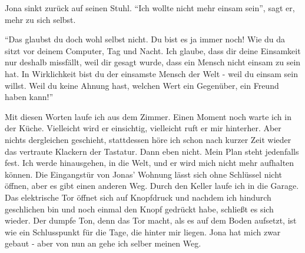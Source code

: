 Jona sinkt zurück auf seinen Stuhl. "`Ich wollte nicht mehr einsam sein"', sagt er, mehr zu sich selbst.

"`Das glaubst du doch wohl selbst nicht. Du bist es ja immer noch! Wie du da sitzt vor deinem Computer, Tag und Nacht. Ich glaube, dass dir deine Einsamkeit nur deshalb missfällt, weil dir gesagt wurde, dass ein Mensch nicht einsam zu sein hat. In Wirklichkeit bist du der einsamste Mensch der Welt - weil du einsam sein willst. Weil du keine Ahnung hast, welchen Wert ein Gegenüber, ein Freund haben kann!"'

Mit diesen Worten laufe ich aus dem Zimmer. Einen Moment noch warte ich in der Küche. Vielleicht wird er einsichtig, vielleicht ruft er mir hinterher. Aber nichts dergleichen geschieht, stattdessen höre ich schon nach kurzer Zeit wieder das vertraute Klackern der Tastatur. Dann eben nicht. Mein Plan steht jedenfalls fest. Ich werde hinausgehen, in die Welt, und er wird mich nicht mehr aufhalten können. Die Eingangstür von Jonas' Wohnung lässt sich ohne Schlüssel nicht öffnen, aber es gibt einen anderen Weg. Durch den Keller laufe ich in die Garage. Das elektrische Tor öffnet sich auf Knopfdruck und nachdem ich hindurch geschlichen bin und noch einmal den Knopf gedrückt habe, schließt es sich wieder. Der dumpfe Ton, denn das Tor macht, als es auf dem Boden aufsetzt, ist wie ein Schlusspunkt für die Tage, die hinter mir liegen. Jona hat mich zwar gebaut - aber von nun an gehe ich selber meinen Weg.